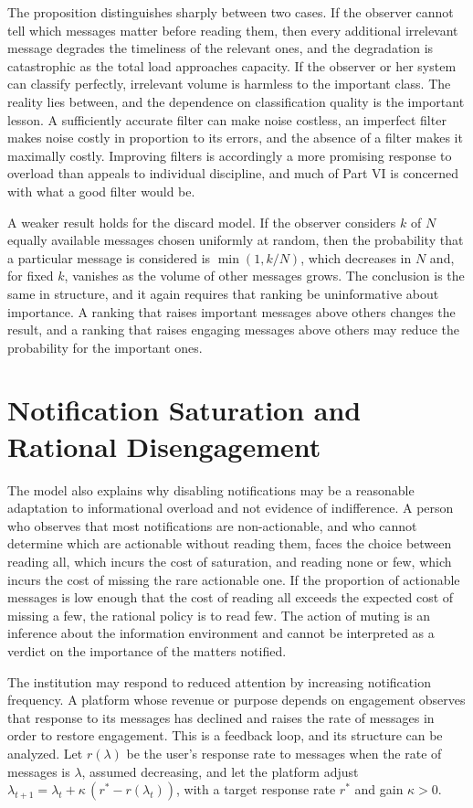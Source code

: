 \documentclass[11pt]{report}
\theoremstyle{definition}
\theoremstyle{remark}
\begin{document}
The proposition distinguishes sharply between two cases. If the observer cannot tell which messages matter before reading them, then every additional irrelevant message degrades the timeliness of the relevant ones, and the degradation is catastrophic as the total load approaches capacity. If the observer or her system can classify perfectly, irrelevant volume is harmless to the important class. The reality lies between, and the dependence on classification quality is the important lesson. A sufficiently accurate filter can make noise costless, an imperfect filter makes noise costly in proportion to its errors, and the absence of a filter makes it maximally costly. Improving filters is accordingly a more promising response to overload than appeals to individual discipline, and much of Part VI is concerned with what a good filter would be.

A weaker result holds for the discard model. If the observer considers $k$ of $N$ equally available messages chosen uniformly at random, then the probability that a particular message is considered is $\min(1,k/N)$, which decreases in $N$ and, for fixed $k$, vanishes as the volume of other messages grows. The conclusion is the same in structure, and it again requires that ranking be uninformative about importance. A ranking that raises important messages above others changes the result, and a ranking that raises engaging messages above others may reduce the probability for the important ones.

\section{Notification Saturation and Rational Disengagement}

The model also explains why disabling notifications may be a reasonable adaptation to informational overload and not evidence of indifference. A person who observes that most notifications are non-actionable, and who cannot determine which are actionable without reading them, faces the choice between reading all, which incurs the cost of saturation, and reading none or few, which incurs the cost of missing the rare actionable one. If the proportion of actionable messages is low enough that the cost of reading all exceeds the expected cost of missing a few, the rational policy is to read few. The action of muting is an inference about the information environment and cannot be interpreted as a verdict on the importance of the matters notified.

The institution may respond to reduced attention by increasing notification frequency. A platform whose revenue or purpose depends on engagement observes that response to its messages has declined and raises the rate of messages in order to restore engagement. This is a feedback loop, and its structure can be analyzed. Let $r(\lambda)$ be the user's response rate to messages when the rate of messages is $\lambda$, assumed decreasing, and let the platform adjust $\lambda_{t+1}=\lambda_t+\kappa\,(r^\ast-r(\lambda_t))$, with a target response rate $r^\ast$ and gain $\kappa>0$.
\end{document}
